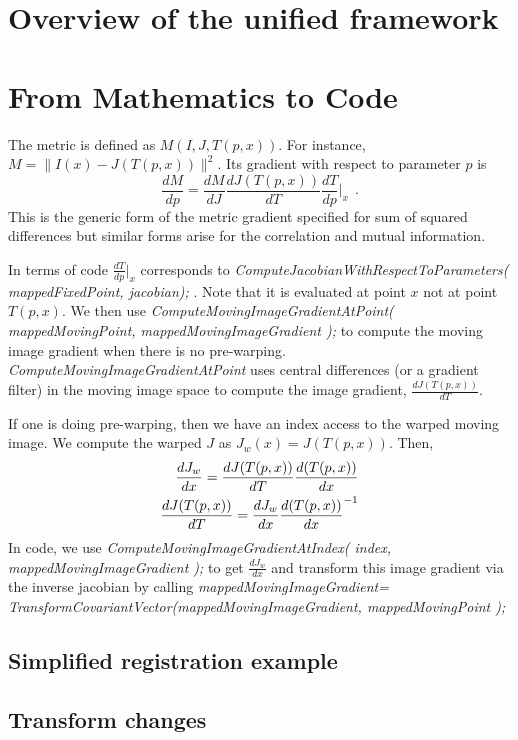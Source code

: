 \documentclass{llncs}
\begin{document}
\section{Overview of the unified framework}


\section{From Mathematics to Code}
The metric is defined as $M(I,J,T(p,x))$.  For instance, $M=\|
I(x)-J(T(p,x)) \|^2$. Its gradient with respect to parameter $p$
is $$\frac{dM}{dp}=\frac{dM}{dJ}\frac{dJ(T(p,x))}{dT} \frac{dT}{dp}|_x
~~.$$  This is the generic form of the metric gradient specified for
sum of squared differences but similar forms arise for the correlation
and mutual information.  

In terms of code $\frac{dT}{dp}|_x$ corresponds to {\em
ComputeJacobianWithRespectToParameters( mappedFixedPoint, jacobian);
}.  Note that it is evaluated at point $x$ not at point $T(p,x)$.  We
then use {\em
ComputeMovingImageGradientAtPoint( mappedMovingPoint,
mappedMovingImageGradient );} to compute the moving image gradient
when there is no pre-warping.  {\em ComputeMovingImageGradientAtPoint} uses central
differences (or a gradient filter) in the moving image space to
compute the image gradient, $\frac{dJ(T(p,x))}{dT}$.

 If one is doing pre-warping, then we have an index access to the
 warped moving image.  We compute the warped $J$ as
 $J_w(x)=J(T(p,x))$.  Then,
\begin{eqnarray}
\frac{dJ_w}{dx}=\frac{dJ(T(p,x))}{dT}\frac{d(T(p,x))}{dx} \\ \notag
\frac{dJ(T(p,x))}{dT}=\frac{dJ_w}{dx}{\frac{d(T(p,x))}{dx}}^{-1} 
\end{eqnarray}
In code, we use {\em ComputeMovingImageGradientAtIndex( index,
mappedMovingImageGradient );} to get $\frac{dJ_w}{dx}$ and transform
this image gradient via the inverse jacobian by calling 
{\em mappedMovingImageGradient=
TransformCovariantVector(mappedMovingImageGradient, mappedMovingPoint ); }



\subsection{Simplified registration example}

\subsection{Transform changes}
\end{document}
